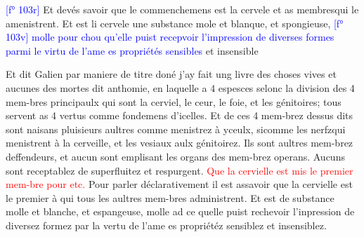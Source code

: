 \documentclass[11pt,a4paper, twoside, openany]{memoir}
\newcommand{\folio}[1]{\textcolor{blue}{[f° #1]}}
\newcommand{\titre}[1]{\textcolor{red}{#1}}
\begin{document}
\begin{pairs}
\begin{Leftside}
\beginnumbering
\pstart
\folio{103r}
Et devés savoir que le commenchemens est la cervele
et as membresqui le amenistrent. Et est li cervele
une substance mole et blanque, et spongieuse, \folio{103v}
\textcolor{blue}{molle pour chou qu'elle puist recepvoir l’impression
de diverses formes parmi le virtu de l’ame es propriétés sensibles}
et insensible
\pend
\endnumbering
\end{Leftside}
\begin{Rightside}
\beginnumbering
\pstart
Et dit Galien par maniere de titre doné j'ay fait ung livre des choses vives et aucunes des mortes dit anthomie, en laquelle a 4 espesces selonc la division des 4 mem-bres principaulx qui sont la cerviel, le ceur, le foie, et les génitoires; tous servent as 4 vertus comme fondemens d'icelles. Et de ces 4 mem-brez dessus dits sont naisans pluisieurs aultres comme menistrez à yceulx, sicomme les nerfzqui menistrent à la cerveille, et les vesiaux aulx génitoirez. Ils sont aultres mem-brez deffendeurs,
et aucun sont emplisant les organs des mem-brez operans.
Aucuns sont receptablez de superfluitez et respurgent.
\titre{Que la cervielle est mis le premier mem-bre pour etc.}
Pour parler déclarativement il est assavoir que la cervielle est le premier à qui tous les
aultres mem-bres administrent. Et est de substance molle
et blanche, et espangeuse, molle ad ce quelle puist rechevoir
l'inpression de diversez formez par la vertu de l'ame es
propriétéz sensiblez et insensiblez.
\pend
\endnumbering
\end{Rightside}
\end{pairs}
\Columns
\end{document}
